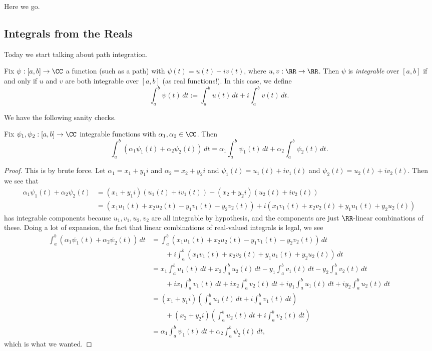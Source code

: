 
Here we go.

\subsection{Integrals from the Reals}
Today we start talking about path integration.
\begin{definition}[Integrable]
	Fix $\psi:[a,b]\to\CC$ a function (such as a path) with $\psi(t)=u(t)+iv(t)$, where $u,v:\RR\to\RR$. Then $\psi$ is \textit{integrable} over $[a,b]$ if and only if $u$ and $v$ are both integrable over $[a,b]$ (as real functions!). In this case, we define
	\[\int_a^b\psi(t)\,dt:=\int_a^bu(t)\,dt+i\int_a^bv(t)\,dt.\]
\end{definition}
We have the following sanity checks.
\begin{lemma} \label{lem:integraldistribute}
	Fix $\psi_1,\psi_2:[a,b]\to\CC$ integrable functions with $\alpha_1,\alpha_2\in\CC$. Then
	\[\int_a^b(\alpha_1\psi_1(t)+\alpha_2\psi_2(t))\,dt=\alpha_1\int_a^b\psi_1(t)\,dt+\alpha_2\int_a^b\psi_2(t)\,dt.\]
\end{lemma}
\begin{proof}
	This is by brute force. Let $\alpha_1=x_1+y_1i$ and $\alpha_2=x_2+y_2i$ and $\psi_1(t)=u_1(t)+iv_1(t)$ and $\psi_2(t)=u_2(t)+iv_2(t)$. Then we see that
	\begin{align*}
		\alpha_1\psi_1(t)+\alpha_2\psi_2(t) &= (x_1+y_1i)(u_1(t)+iv_1(t))+(x_2
		+y_2i)(u_2(t)+iv_2(t)) \\
		&= (x_1u_1(t)+x_2u_2(t)-y_1v_1(t)-y_2v_2(t))+i(x_1v_1(t)+x_2v_2(t)+y_1u_1(t)+y_2u_2(t))
	\end{align*}
	has integrable components because $u_1,v_1,u_2,v_2$ are all integrable by hypothesis, and the components are just $\RR$-linear combinations of these. Doing a lot of expansion, the fact that linear combinations of real-valued integrals is legal, we see
	\begin{align*}
		\int_a^b(\alpha_1\psi_1(t)+\alpha_2\psi_2(t))\,dt &= \int_a^b(x_1u_1(t)+x_2u_2(t)-y_1v_1(t)-y_2v_2(t))\,dt \\
		&\qquad+i\int_a^b(x_1v_1(t)+x_2v_2(t)+y_1u_1(t)+y_2u_2(t))\,dt \\
		&= x_1\int_a^bu_1(t)\,dt+x_2\int_a^bu_2(t)\,dt-y_1\int_a^bv_1(t)\,dt-y_2\int_a^bv_2(t)\,dt \\
		&\qquad+ix_1\int_a^bv_1(t)\,dt+ix_2\int_a^bv_2(t)\,dt+iy_1\int_a^bu_1(t)\,dt+iy_2\int_a^bu_2(t)\,dt \\
		&= (x_1+y_1i)\left(\int_a^bu_1(t)\,dt+i\int_a^bv_1(t)\,dt\right)\\
		&\qquad+(x_2+y_2i)\left(\int_a^bu_2(t)\,dt+i\int_a^bv_2(t)\,dt\right) \\
		&= \alpha_1\int_a^b\psi_1(t)\,dt+\alpha_2\int_a^b\psi_2(t)\,dt,
	\end{align*}
	which is what we wanted.
\end{proof}
